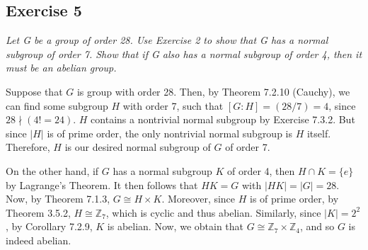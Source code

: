 \subsection*{Exercise 5}
\textit{Let G be a group of order 28. Use Exercise 2 to show that G has a normal subgroup of order 7. Show that if G also has a normal subgroup of order 4, then it must be an abelian group.}

\vspace{5 mm}
Suppose that $G$ is group with order 28. Then, by Theorem 7.2.10 (Cauchy), we can find some subgroup $H$ with order 7, such that $[G:H] = (28/7) = 4$, since $28 \nmid (4! = 24)$. $H$ contains a nontrivial normal subgroup by Exercise 7.3.2. But since $|H|$ is of prime order, the only nontrivial normal subgroup is $H$ itself. Therefore, $H$ is our desired normal subgroup of $G$ of order 7.

On the other hand, if $G$ has a normal subgroup $K$ of order 4, then $H \cap K = \{e\}$ by Lagrange's Theorem. It then follows that $HK = G$ with $|HK| = |G| = 28$. Now, by Theorem 7.1.3, $G \cong H \times K$. Moreover, since $H$ is of prime order, by Theorem 3.5.2, $H \cong \mathbb{Z}_7$, which is cyclic and thus abelian. Similarly, since $|K| = 2^2$, by Corollary 7.2.9, $K$ is abelian. Now, we obtain that $G \cong \mathbb{Z}_7 \times \mathbb{Z}_4$, and so $G$ is indeed abelian.